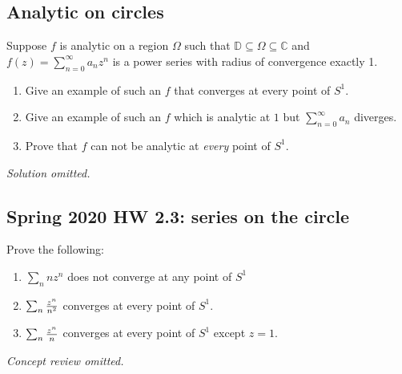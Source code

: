 \hypertarget{analytic-on-circles}{%
\subsection{Analytic on circles}\label{analytic-on-circles}}

\begin{problem}[?]

Suppose \(f\) is analytic on a region \(\Omega\) such that
\({\mathbb{D}}\subseteq \Omega \subseteq {\mathbb{C}}\) and
\(f(z) = \sum_{n=0}^\infty a_n z^n\) is a power series with radius of
convergence exactly 1.

\begin{enumerate}
\def\labelenumi{\alph{enumi}.}
\item
  Give an example of such an \(f\) that converges at every point of
  \(S^1\).
\item
  Give an example of such an \(f\) which is analytic at \(1\) but
  \(\sum_{n=0}^\infty a_n\) diverges.
\item
  Prove that \(f\) can not be analytic at \emph{every} point of \(S^1\).
\end{enumerate}

\end{problem}

\emph{Solution omitted.}

\hypertarget{spring-2020-hw-2.3-series-on-the-circle}{%
\subsection{Spring 2020 HW 2.3: series on the
circle}\label{spring-2020-hw-2.3-series-on-the-circle}}

\begin{problem}[?]

Prove the following:

\begin{enumerate}
\def\labelenumi{\alph{enumi}.}
\item
  \(\sum_{n} nz^n\) does not converge at any point of \(S^1\)
\item
  \(\sum_n {z^n \over n^2}\) converges at every point of \(S^1\).
\item
  \(\sum_n {z^n \over n}\) converges at every point of \(S^1\) except
  \(z=1\).
\end{enumerate}

\end{problem}

\emph{Concept review omitted.}

